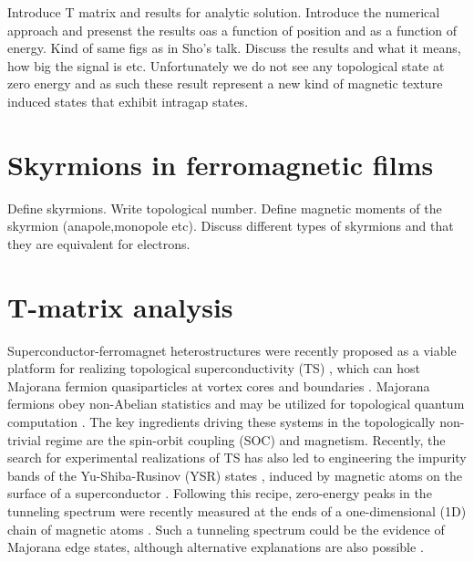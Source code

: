 \documentclass[twocolumn,showpacs,floatfix,nofootinbib,longbibliography]{revtex4-1}
\begin{document}
Introduce T matrix and results for analytic solution.  
Introduce the numerical approach and presenst the results oas a function of position and as a function of energy. Kind of same figs as in Sho’s talk. 
Discuss the results and what it means, how big the signal is etc. Unfortunately we do not see any topological state at zero energy and as such these result represent a new kind of magnetic texture induced states that exhibit intragap states.


\section{Skyrmions in ferromagnetic films} \label{sec:skyrmion}
Define skyrmions.  Write topological number. Define magnetic moments of the skyrmion (anapole,monopole etc). Discuss different types of skyrmions and that they are equivalent for electrons. 

\section{T-matrix analysis} \label{sec:analytics}
Superconductor-ferromagnet heterostructures were recently proposed as a viable platform for realizing topological superconductivity (TS) \cite{Lutchyn2010,Oreg2010, Sau2010}, which can host Majorana fermion quasiparticles at vortex cores and boundaries \cite{Kitaev2001, Alicea, Beenakker2013}. Majorana fermions obey non-Abelian statistics and may be utilized for topological quantum computation \cite{Read2000, Ivanov2001, Nayak2008}.  The key ingredients driving these systems in the topologically non-trivial regime are the spin-orbit coupling (SOC) and magnetism. Recently, the search for experimental realizations of TS has also led to engineering the impurity bands of the Yu-Shiba-Rusinov (YSR) states \cite{Yu,Shiba,Rusinov}, induced by magnetic atoms on the surface of a superconductor \cite{Choy2011, Nadj-Perge2013, Klinovaja2013, Vazifeh2013, Braunecker2013, Pientka2013, Nakosai2013, Poyhonen2014, Reis2014, Brydon2015, Rontynen2014, Li2015}. Following this recipe, zero-energy peaks in the tunneling spectrum were recently measured at the ends of a one-dimensional (1D) chain of magnetic atoms \cite{Yazdani2014}. Such a tunneling spectrum could be the evidence of Majorana edge states, although alternative explanations are also possible \cite{Sau2015}.
\end{document}
